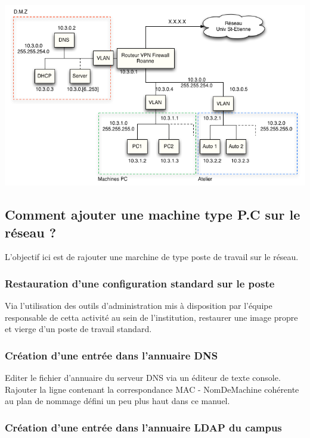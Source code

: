 \documentclass[a4paper]{article}
\begin{document}
\begin{center}
\includegraphics[scale=0.6]{SiteRoanne.png}
\end{center}

\subsection{Comment ajouter une machine type P.C sur le réseau ?}

L'objectif ici est de rajouter une marchine de type poste de travail sur le réseau.

\subsubsection{Restauration d'une configuration standard sur le poste}

Via l'utilisation des outils d'administration mis à disposition par l'équipe responsable de cetta activité au sein de l'institution, restaurer une image propre et vierge d'un poste de travail standard.

\subsubsection{Création d'une entrée dans l'annuaire DNS}

Editer le fichier d'annuaire du serveur DNS via un éditeur de texte console.
Rajouter la ligne contenant la correspondance MAC - NomDeMachine cohérente au plan de nommage défini un peu plus haut dans ce 
manuel.

\subsubsection{Création d'une entrée dans l'annuaire LDAP du campus}
\end{document}
